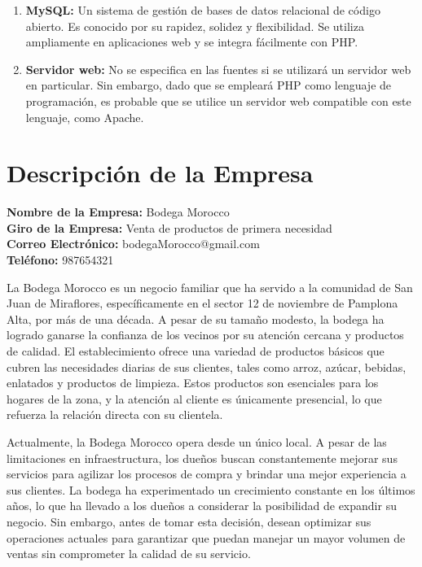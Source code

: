 \documentclass{article}
\begin{document}
\begin{enumerate}
\begin{itemize}
\begin{enumerate}
    \item \textbf{MySQL:} Un sistema de gestión de bases de datos relacional de código abierto. Es conocido por su rapidez, solidez y flexibilidad. Se utiliza ampliamente en aplicaciones web y se integra fácilmente con PHP.
    \item \textbf{Servidor web:} No se especifica en las fuentes si se utilizará un servidor web en particular. Sin embargo, dado que se empleará PHP como lenguaje de programación, es probable que se utilice un servidor web compatible con este lenguaje, como Apache.
  \end{enumerate}
\end{itemize}


\end{enumerate}



\newpage

\section{Descripción de la Empresa}

  \begin{spacing}{1.5}
    \noindent
    \textbf{Nombre de la Empresa:} Bodega Morocco \\
    \textbf{Giro de la Empresa:} Venta de productos de primera necesidad \\
    \textbf{Correo Electrónico:} bodegaMorocco@gmail.com \\
    \textbf{Teléfono:} 987654321
  \end{spacing}

  La Bodega Morocco es un negocio familiar que ha servido a la comunidad de San Juan de Miraflores, específicamente en el sector 12 de noviembre de Pamplona Alta, por más de una década. A pesar de su tamaño modesto, la bodega ha logrado ganarse la confianza de los vecinos por su atención cercana y productos de calidad. El establecimiento ofrece una variedad de productos básicos que cubren las necesidades diarias de sus clientes, tales como arroz, azúcar, bebidas, enlatados y productos de limpieza. Estos productos son esenciales para los hogares de la zona, y la atención al cliente es únicamente presencial, lo que refuerza la relación directa con su clientela.

  Actualmente, la Bodega Morocco opera desde un único local. A pesar de las limitaciones en infraestructura, los dueños buscan constantemente mejorar sus servicios para agilizar los procesos de compra y brindar una mejor experiencia a sus clientes. La bodega ha experimentado un crecimiento constante en los últimos años, lo que ha llevado a los dueños a considerar la posibilidad de expandir su negocio. Sin embargo, antes de tomar esta decisión, desean optimizar sus operaciones actuales para garantizar que puedan manejar un mayor volumen de ventas sin comprometer la calidad de su servicio.
\end{document}
